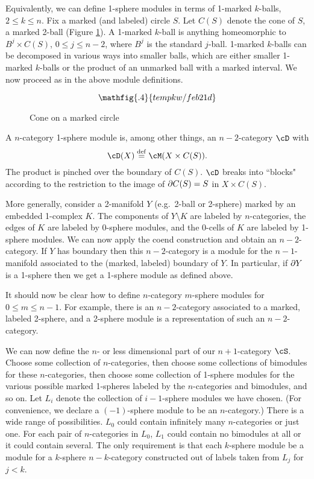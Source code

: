 Equivalently, we can define 1-sphere modules in terms of 1-marked $k$-balls, $2\le k\le n$.
Fix a marked (and labeled) circle $S$.
Let $C(S)$ denote the cone of $S$, a marked 2-ball (Figure \ref{feb21d}).
A 1-marked $k$-ball is anything homeomorphic to $B^j \times C(S)$, $0\le j\le n-2$, 
where $B^j$ is the standard $j$-ball.
1-marked $k$-balls can be decomposed in various ways into smaller balls, which are either 
smaller 1-marked $k$-balls or the product of an unmarked ball with a marked interval.
We now proceed as in the above module definitions.

\begin{figure}[!ht]
\begin{equation*}
\mathfig{.4}{tempkw/feb21d}
\end{equation*}
\caption{Cone on a marked circle}
\label{feb21d}
\end{figure}

A $n$-category 1-sphere module is, among other things, an $n{-}2$-category $\cD$ with
\[
	\cD(X) \deq \cM(X\times C(S)) .
\]
The product is pinched over the boundary of $C(S)$.
$\cD$ breaks into ``blocks" according to the restriction to the 
image of $\partial C(S) = S$ in $X\times C(S)$.

More generally, consider a 2-manifold $Y$ 
(e.g.\ 2-ball or 2-sphere) marked by an embedded 1-complex $K$.
The components of $Y\setminus K$ are labeled by $n$-categories, 
the edges of $K$ are labeled by 0-sphere modules, 
and the 0-cells of $K$ are labeled by 1-sphere modules.
We can now apply the coend construction and obtain an $n{-}2$-category.
If $Y$ has boundary then this $n{-}2$-category is a module for the $n{-}1$-manifold
associated to the (marked, labeled) boundary of $Y$.
In particular, if $\partial Y$ is a 1-sphere then we get a 1-sphere module as defined above.

\medskip

It should now be clear how to define $n$-category $m$-sphere modules for $0\le m \le n-1$.
For example, there is an $n{-}2$-category associated to a marked, labeled 2-sphere,
and a 2-sphere module is a representation of such an $n{-}2$-category.

\medskip

We can now define the $n$- or less dimensional part of our $n{+}1$-category $\cS$.
Choose some collection of $n$-categories, then choose some collections of bimodules for
these $n$-categories, then choose some collection of 1-sphere modules for the various
possible marked 1-spheres labeled by the $n$-categories and bimodules, and so on.
Let $L_i$ denote the collection of $i{-}1$-sphere modules we have chosen.
(For convenience, we declare a $(-1)$-sphere module to be an $n$-category.)
There is a wide range of possibilities.
$L_0$ could contain infinitely many $n$-categories or just one.
For each pair of $n$-categories in $L_0$, $L_1$ could contain no bimodules at all or 
it could contain several.
The only requirement is that each $k$-sphere module be a module for a $k$-sphere $n{-}k$-category
constructed out of labels taken from $L_j$ for $j<k$.

